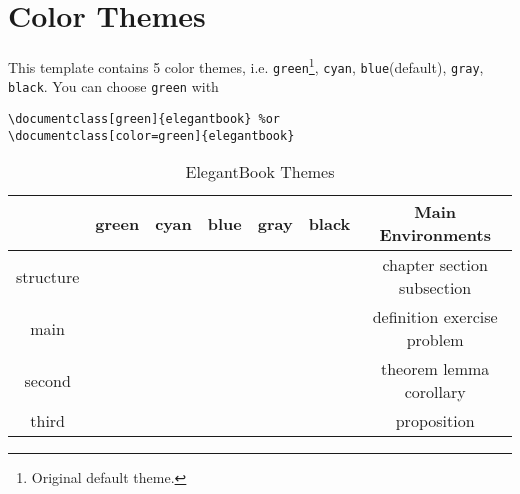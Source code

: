 \documentclass[fancy,blue,11pt]{elegantbook}
\begin{document}
\section{Color Themes}
This template contains 5 color themes, i.e. \textcolor{structure1}{\lstinline{green}}\footnote{Original default theme.}, \textcolor{structure2}{\lstinline{cyan}}, \textcolor{structure3}{\lstinline{blue}}(default), \textcolor{structure4}{\lstinline{gray}}, \textcolor{structure5}{\lstinline{black}}. You can choose \lstinline{green} with
\begin{lstlisting}
\documentclass[green]{elegantbook} %or
\documentclass[color=green]{elegantbook}
\end{lstlisting}


\begin{table}[htbp]
\caption{ElegantBook Themes\label{tab:color thm}}
\centering
\begin{tabular}{ccccccc}
\toprule
	        & \textcolor{structure1}{green} 
	        & \textcolor{structure2}{cyan} 
	        & \textcolor{structure3}{blue}
	        & \textcolor{structure4}{gray} 
	        & \textcolor{structure5}{black} 
	        & Main Environments\\
\midrule
structure & \makecell{{\color{structure1}\rule{1cm}{1cm}}}
				& \makecell{{\color{structure2}\rule{1cm}{1cm}}}
				& \makecell{{\color{structure3}\rule{1cm}{1cm}}} 
				& \makecell{{\color{structure4}\rule{1cm}{1cm}}} 
				& \makecell{{\color{structure5}\rule{1cm}{1cm}}} 
				& chapter  section  subsection \\
main      & \makecell{{\color{main1}\rule{1cm}{1cm}}}
				& \makecell{{\color{main2}\rule{1cm}{1cm}}}
				& \makecell{{\color{main3}\rule{1cm}{1cm}}}
				& \makecell{{\color{main4}\rule{1cm}{1cm}}}
				& \makecell{{\color{main5}\rule{1cm}{1cm}}}
				& definition  exercise  problem  \\
second    & \makecell{{\color{second1}\rule{1cm}{1cm}}}
				& \makecell{{\color{second2}\rule{1cm}{1cm}}}
				& \makecell{{\color{second3}\rule{1cm}{1cm}}}
				& \makecell{{\color{second4}\rule{1cm}{1cm}}}
				& \makecell{{\color{second5}\rule{1cm}{1cm}}}
				& theorem  lemma  corollary\\
third     & \makecell{{\color{third1}\rule{1cm}{1cm}}}
				& \makecell{{\color{third2}\rule{1cm}{1cm}}}
				& \makecell{{\color{third3}\rule{1cm}{1cm}}}
				& \makecell{{\color{third4}\rule{1cm}{1cm}}}
				& \makecell{{\color{third5}\rule{1cm}{1cm}}}
				& proposition\\
\bottomrule
\end{tabular}
\end{table}
\end{document}
